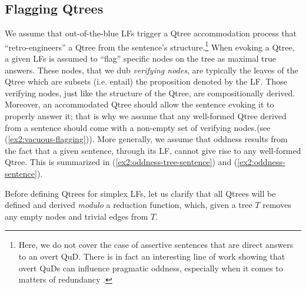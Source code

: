 \subsection{Flagging Qtrees}
We assume that out-of-the-blue LFs trigger a Qtree accommodation process that ``retro-engineers'' a Qtree from the sentence's structure.\footnote{Here, we do not cover the case of assertive sentences that are direct answers to an overt QuD. There is in fact an interesting line of work showing that overt QuDs can influence pragmatic oddness, especially when it comes to matters of redundancy \citep{Haslinger2023}.} When evoking a Qtree, a given LFs is assumed to ``flag'' specific nodes on the tree as maximal true answers. These nodes, that we dub \textit{verifying nodes}, are typically the leaves of the Qtree which are subsets (i.e. entail) the proposition denoted by the LF. Those verifying nodes, just like the structure of the Qtree, are compositionally derived. Moreover, an accommodated Qtree should allow the sentence evoking it to properly answer it; that is why we assume that any well-formed Qtree derived from a sentence should come with a non-empty set of verifying nodes.(see (\ref{ex2:vacuous-flagging})). More generally, we assume that oddness results from the fact that a given sentence, through its LF, cannot give rise to any well-formed Qtree. This is summarized in (\ref{ex2:oddness-tree-sentence}) and (\ref{ex2:oddness-sentence}).





\begin{exe}
	\label{ex2:vacuous-flagging}
	\label{ex2:oddness-tree-sentence}
	\label{ex2:oddness-sentence}
\end{exe}

Before defining Qtrees for simplex LFs, let us clarify that all Qtrees will be defined and derived \textit{modulo} a reduction function, which, given a tree $T$ removes any empty nodes and trivial edges from $T$.

